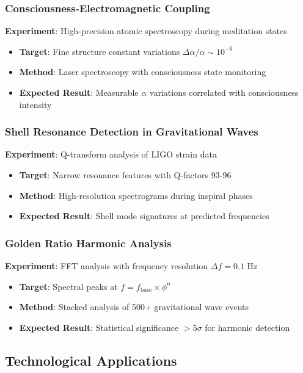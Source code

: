 \documentclass[12pt,a4paper]{article}
\begin{document}
\subsubsection{Consciousness-Electromagnetic Coupling}
\textbf{Experiment}: High-precision atomic spectroscopy during meditation states
\begin{itemize}
\item \textbf{Target}: Fine structure constant variations $\Delta\alpha/\alpha \sim 10^{-6}$
\item \textbf{Method}: Laser spectroscopy with consciousness state monitoring
\item \textbf{Expected Result}: Measurable $\alpha$ variations correlated with consciousness intensity
\end{itemize}

\subsubsection{Shell Resonance Detection in Gravitational Waves}
\textbf{Experiment}: Q-transform analysis of LIGO strain data
\begin{itemize}
\item \textbf{Target}: Narrow resonance features with Q-factors 93-96
\item \textbf{Method}: High-resolution spectrograms during inspiral phases
\item \textbf{Expected Result}: Shell mode signatures at predicted frequencies
\end{itemize}

\subsubsection{Golden Ratio Harmonic Analysis}
\textbf{Experiment}: FFT analysis with frequency resolution $\Delta f = 0.1$ Hz
\begin{itemize}
\item \textbf{Target}: Spectral peaks at $f = f_{\text{base}} \times \phi^n$
\item \textbf{Method}: Stacked analysis of 500+ gravitational wave events
\item \textbf{Expected Result}: Statistical significance $>5\sigma$ for harmonic detection
\end{itemize}

\subsection{Technological Applications}
\end{document}
